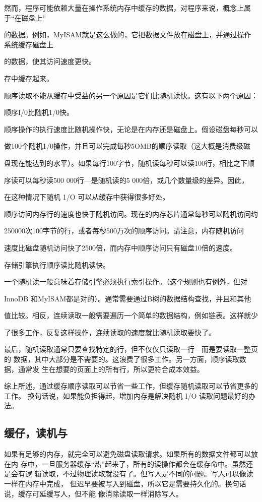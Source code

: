 然而，程序可能依赖大量在操作系统内存中缓存的数据，对程序来说，概念上属于“在磁盘上”

的数据。例如，MyISAM就是这么做的，它把数据文件放在磁盘上，并通过操作系统缓存磁盘上

的数据，使其访问速度更快。

存中缓存起来。

顺序读取不能从缓存中受益的另一个原因是它们比随机读快。这有以下两个原因：

顺序I/0比随机1/0快。

顺序操作的执行速度比随机操作快，无论是在内存还是磁盘上。假设磁盘每秒可以

做100个随机1/0操作，并且可以完成每秒5OMB的顺序读取（这大概是消费级磁

盘现在能达到的水平）。如果每行100字节，随机读每秒可以读100行，相比之下顺

序读可以每秒读500 000行—是随机读的5 000倍，或几个数量级的差异。因此，

在这种情况下随机 1/O 可以从缓存中获得很多好处。

顺序访问内存行的速度也快于随机访问。现在的内存芯片通常每秒可以随机访问约

250000次100字节的行，或者每秒500万次的顺序访问。请注意，内存随机访问

速度比磁盘随机访问快了2500倍，而内存中顺序访问只有磁盘10倍的速度。

存储引擎执行顺序读比随机读快。

一个随机读一般意味着存储引擎必须执行索引操作。（这个规则也有例外，但对

InnoDB 和MyISAM都是对的）。通常需要通过B树的数据结构查找，并且和其他

值比较。相反，连续读取一般需要遍历一个简单的数据结构，例如链表。这样就少

了很多工作，反复这样操作，连续读取的速度就比随机读取要快了。

最后，随机读取通常只要查找特定的行，但不仅仅只读取一行—而是要读取一整页的
数据，其中大部分是不需要的。这浪费了很多工作。另一方面，顺序读取数据，通常发
生在想要的页面上的所有行，所以更符合成本效益。

综上所述，通过缓存顺序读取可以节省一些工作，但缓存随机读取可以节省更多的工作。
换句话说，如果能负担得起，增加内存是解决随机 I/O 读取问题最好的办法。

\subsection{缓仔，读机与}
如果有足够的内存，就完全可以避免磁盘读取请求。如果所有的数据文件都可以放在内
存中，一旦服务器缓存“热”起来了，所有的读操作都会在缓存命中。虽然还是会有逻
辑读取，不过物理读取就没有了。但写人是不同的问题。写人可以像读一样在内存中完成，
但迟早要被写入到磁盘，所以它是需要持久化的。换句话说，缓存可延缓写人，但不能
像消除读取一样消除写人。

